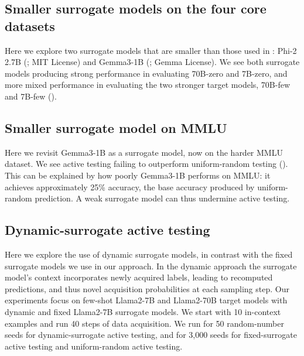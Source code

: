 \subsection{Smaller surrogate models on the four core datasets}





Here we explore two surrogate models that are smaller than those used in : Phi-2 2.7B (\citealp{javaheripi2023phi}; MIT License) and Gemma3-1B (\citealp{kamath2025gemma}; Gemma License).
We see both surrogate models producing strong performance in evaluating 70B-zero and 7B-zero, and more mixed performance in evaluating the two stronger target models, 70B-few and 7B-few ().


\subsection{Smaller surrogate model on MMLU}\label{section:failure_case_mmlu}





Here we revisit Gemma3-1B as a surrogate model, now on the harder MMLU dataset.
We see active testing failing to outperform uniform-random testing ().
This can be explained by how poorly Gemma3-1B performs on MMLU: it achieves approximately 25\% accuracy, the base accuracy produced by uniform-random prediction.
A weak surrogate model can thus undermine active testing.


\subsection{Dynamic-surrogate active testing}\label{sec:dynamic_surrogate}

Here we explore the use of dynamic surrogate models, in contrast with the fixed surrogate models we use in our approach.
In the dynamic approach the surrogate model's context incorporates newly acquired labels, leading to recomputed predictions, and thus novel acquisition probabilities at each sampling step.
Our experiments focus on few-shot Llama2-7B and Llama2-70B target models with dynamic and fixed Llama2-7B surrogate models.
We start with 10 in-context examples and run 40 steps of data acquisition.
We run for 50 random-number seeds for dynamic-surrogate active testing, and for 3,000 seeds for fixed-surrogate active testing and uniform-random active testing.

